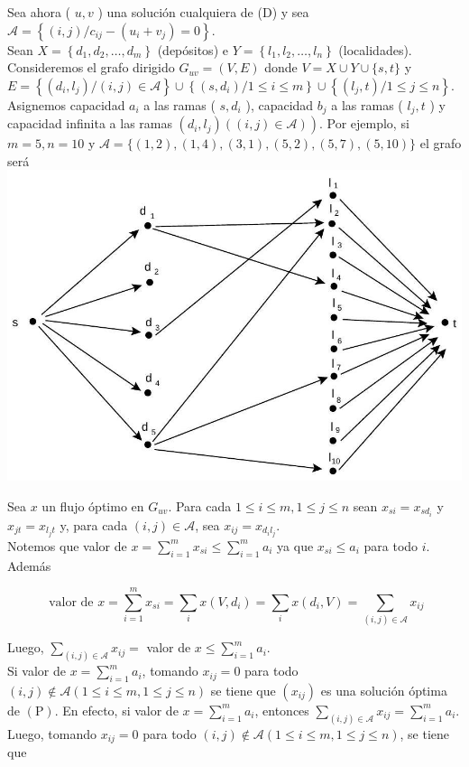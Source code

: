 \documentclass[10pt]{article}
\begin{document}
Sea ahora ( $u, v$ ) una solución cualquiera de (D) y sea $\mathcal{A}=\left\{(i, j) / c_{i j}-\left(u_{i}+v_{j}\right)=0\right\}$.\\
Sean $X=\left\{d_{1}, d_{2}, \ldots, d_{m}\right\}$ (depósitos) e $Y=\left\{l_{1}, l_{2}, \ldots, l_{n}\right\}$ (localidades). Consideremos el grafo dirigido $G_{u v}=(V, E)$ donde $V=X \cup Y \cup\{s, t\}$ y $E=\left\{\left(d_{i}, l_{j}\right) /(i, j) \in \mathcal{A}\right\} \cup\left\{\left(s, d_{i}\right) / 1 \leq i \leq m\right\} \cup\left\{\left(l_{j}, t\right) / 1 \leq j \leq n\right\}$. Asignemos capacidad $a_{i}$ a las ramas ( $s, d_{i}$ ), capacidad $b_{j}$ a las ramas ( $l_{j}, t$ ) y capacidad infinita a las ramas $\left.\left(d_{i}, l_{j}\right)((i, j) \in \mathcal{A})\right)$. Por ejemplo, si $m=5, n=10$ y $\mathcal{A}=\{(1,2),(1,4),(3,1),(5,2),(5,7),(5,10)\}$ el grafo será\\
\includegraphics[max width=\textwidth, center]{2025_09_05_aa5f7b8425e7dd302062g-29}

Sea $x$ un flujo óptimo en $G_{u v}$. Para cada $1 \leq i \leq m, 1 \leq j \leq n$ sean $x_{s i}=x_{s d_{i}}$ y $x_{j t}=x_{l_{j} t}$ y, para cada $(i, j) \in \mathcal{A}$, sea $x_{i j}=x_{d_{i} l_{j}}$.\\
Notemos que valor de $x=\sum_{i=1}^{m} x_{s i} \leq \sum_{i=1}^{m} a_{i}$ ya que $x_{s i} \leq a_{i}$ para todo $i$.\\
Además

$$
\text { valor de } x=\sum_{i=1}^{m} x_{s i}=\sum_{i} x\left(V, d_{i}\right)=\sum_{i} x\left(d_{i}, V\right)=\sum_{(i, j) \in \mathcal{A}} x_{i j}
$$

Luego, $\sum_{(i, j) \in \mathcal{A}} x_{i j}=$ valor de $x \leq \sum_{i=1}^{m} a_{i}$.\\
Si valor de $x=\sum_{i=1}^{m} a_{i}$, tomando $x_{i j}=0$ para todo $(i, j) \notin \mathcal{A}(1 \leq i \leq m, 1 \leq j \leq n)$ se tiene que $\left(x_{i j}\right)$ es una solución óptima de $(\mathrm{P})$. En efecto, si valor de $x=\sum_{i=1}^{m} a_{i}$, entonces $\sum_{(i, j) \in \mathcal{A}} x_{i j}=\sum_{i=1}^{m} a_{i}$.\\
Luego, tomando $x_{i j}=0$ para todo $(i, j) \notin \mathcal{A}(1 \leq i \leq m, 1 \leq j \leq n)$, se tiene que
\end{document}
